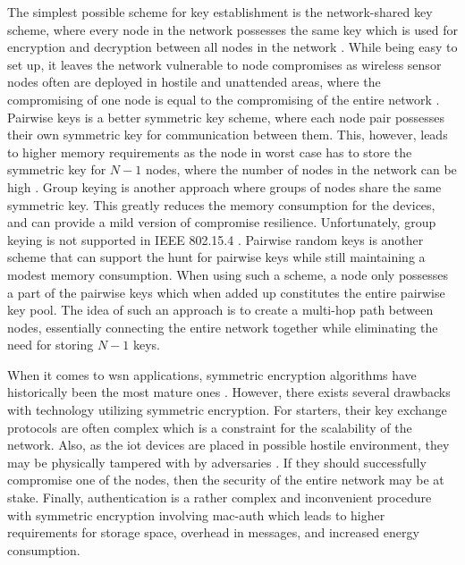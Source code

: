 
The simplest possible scheme for key establishment is the network-shared key scheme, where every node in the network possesses the same key which is used for encryption and decryption between all nodes in the network \cite{perrig2004security}. While being easy to set up, it leaves the network vulnerable to node compromises as wireless sensor nodes often are deployed in hostile and unattended areas, where the compromising of one node is equal to the compromising of the entire network \cite{krentz20136lowpan}. Pairwise keys is a better symmetric key scheme, where each node pair possesses their own symmetric key for communication between them. This, however, leads to higher memory requirements as the node in worst case has to store the symmetric key for $N-1$ nodes, where the number of nodes in the network can be high \cite{perrig2004security}. Group keying is another approach where groups of nodes share the same symmetric key. This greatly reduces the memory consumption for the devices, and can provide a mild version of compromise resilience. Unfortunately, group keying is not supported in IEEE 802.15.4 \cite{sastry2004security}. Pairwise random keys is another scheme that can support the hunt for pairwise keys while still maintaining a modest memory consumption. When using such a scheme, a node only possesses a part of the pairwise keys which when added up constitutes the entire pairwise key pool. The idea of such an approach is to create a multi-hop path between nodes, essentially connecting the entire network together while eliminating the need for storing $N-1$ keys.



When it comes to \gls{wsn} applications, symmetric encryption algorithms have historically been the most mature ones \citep{Jing2014}. However, there exists several drawbacks with technology utilizing symmetric encryption. For starters, their key exchange protocols are often complex which is a constraint for the scalability of the network. Also, as the \gls{iot} devices are placed in possible hostile environment, they may be physically tampered with by adversaries \cite{krentz20136lowpan}. If they should successfully compromise one of the nodes, then the security of the entire network may be at stake. Finally, authentication is a rather complex and inconvenient procedure with symmetric encryption involving \gls{mac-auth} which leads to higher requirements for storage space, overhead in messages, and increased energy consumption.

